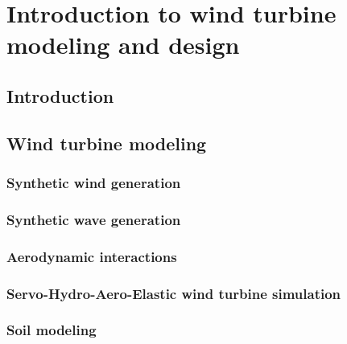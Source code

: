 \chapter{Introduction to wind turbine modeling and design}
\hfill
\localtableofcontents
\newpage







\section{Introduction}

\section{Wind turbine modeling}
    \subsection{Synthetic wind generation }
    \subsection{Synthetic wave generation}
    \subsection{Aerodynamic interactions}
    \subsection{Servo-Hydro-Aero-Elastic wind turbine simulation }
    \subsection{Soil modeling}
